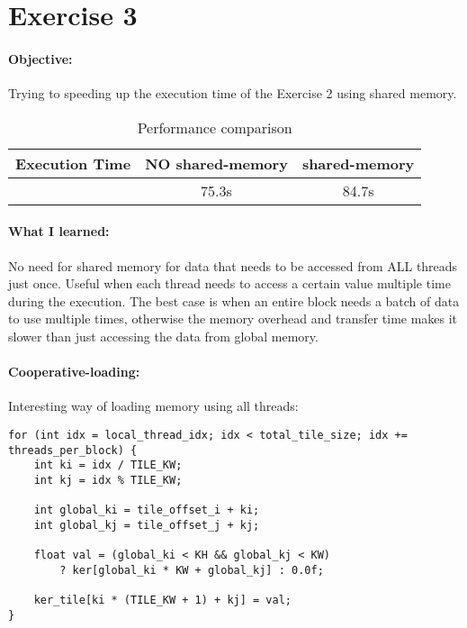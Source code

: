\documentclass{article}
\begin{document}
\newpage

\section{Exercise 3}
\paragraph{Objective:}
Trying to speeding up the execution time of the Exercise 2 using shared memory. 

\begin{table}[h!]
  \centering
  \begin{tabular}{c|c|c}
  \textbf{Execution Time} & \textbf{NO shared-memory} & \textbf{shared-memory} \\
  \hline
  & 75.3s & 84.7s \\
  \end{tabular}
  \caption{Performance comparison}
  \label{tab:simple_table}
\end{table}

\paragraph{What I learned:}
No need for shared memory for data that needs to be accessed from ALL threads just once. Useful when each thread needs to access a certain value multiple time during the execution. The best case is when an entire block needs a batch of data to use multiple times, otherwise the memory overhead and transfer time makes it slower than just accessing the data from global memory.

\paragraph{Cooperative-loading:} Interesting way of loading memory using all threads:

\begin{lstlisting}[caption=Index edge-case]
for (int idx = local_thread_idx; idx < total_tile_size; idx += threads_per_block) {
    int ki = idx / TILE_KW;
    int kj = idx % TILE_KW;

    int global_ki = tile_offset_i + ki;
    int global_kj = tile_offset_j + kj;

    float val = (global_ki < KH && global_kj < KW)
        ? ker[global_ki * KW + global_kj] : 0.0f;

    ker_tile[ki * (TILE_KW + 1) + kj] = val;
}
\end{lstlisting}
\end{document}
